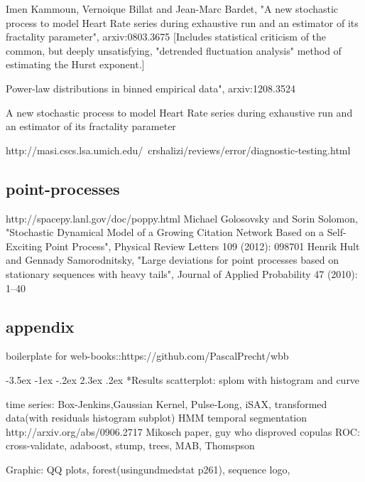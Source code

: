 \documentclass[12pt]{article}
\makeatletter
\renewcommand\section{\@startsection{section}{1}{\z@}%
                                  {-3.5ex \@plus -1ex \@minus -.2ex}%
                                  {2.3ex \@plus.2ex}%
                                  {\normalfont\bfseries}}
\makeatother
\begin{document}
Imen Kammoun, Vernoique Billat and Jean-Marc Bardet, "A new stochastic process to model Heart Rate series during exhaustive run and an estimator of its fractality parameter", arxiv:0803.3675 [Includes statistical criticism of the common, but deeply unsatisfying, "detrended fluctuation analysis" method of estimating the Hurst exponent.]

Power-law distributions in binned empirical data", arxiv:1208.3524

A new stochastic process to model Heart Rate series during exhaustive run and
an estimator of its fractality parameter

http://masi.cscs.lsa.umich.edu/~crshalizi/reviews/error/diagnostic-testing.html

\subsection{point-processes}
http://spacepy.lanl.gov/doc/poppy.html
Michael Golosovsky and Sorin Solomon, "Stochastic Dynamical Model of a Growing Citation Network Based on a Self-Exciting Point Process", Physical Review Letters 109 (2012): 098701
Henrik Hult and Gennady Samorodnitsky, "Large deviations for point processes based on stationary sequences with heavy tails", Journal of Applied Probability 47 (2010): 1--40


\subsection{appendix}
boilerplate for web-books::https://github.com/PascalPrecht/wbb


\section*{Results}
scatterplot:
splom with histogram and curve

time series:
Box-Jenkins,Gaussian Kernel, Pulse-Long, iSAX, transformed data(with residuals histogram subplot)
HMM temporal segmentation
http://arxiv.org/abs/0906.2717 Mikosch paper, guy who disproved copulas
ROC:
cross-validate, adaboost, stump, trees, MAB, Thomspson

Graphic:
QQ plots, forest(usingundmedstat p261), sequence logo,
\end{document}
